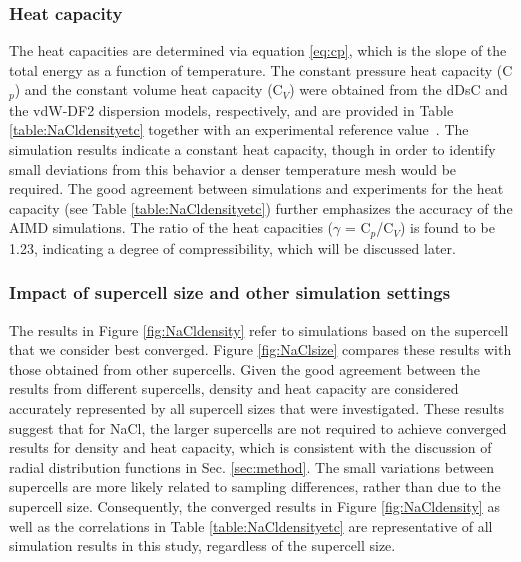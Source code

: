 \documentclass[preprint,3p,10pt,onecolumn,number,sort&compress]{elsarticle}
\begin{document}
\subsubsection{Heat capacity} 
The heat capacities are determined via equation \ref{eq:cp}, which is the slope of the total energy as a function of temperature. The constant pressure heat capacity (C$_p$) and the constant volume heat capacity (C$_V$) were obtained from the dDsC and the vdW-DF2 dispersion models, respectively, and are provided in Table \ref{table:NaCldensityetc} together with an experimental reference value~\cite{NIST}. The simulation results indicate a constant heat capacity, though in order to identify small deviations from this behavior a denser temperature mesh would be required. The good agreement between simulations and experiments for the heat capacity (see Table \ref{table:NaCldensityetc}) further emphasizes the accuracy of the AIMD simulations. The ratio of the heat capacities ($\gamma$ = C$_p$/C$_V$) is found to be 1.23, indicating a degree of compressibility, which will be discussed later. 


\subsubsection{Impact of supercell size and other simulation settings}
The results in Figure \ref{fig:NaCldensity} refer to simulations based on the supercell that we consider best converged. Figure \ref{fig:NaClsize} compares these results with those obtained from other supercells. Given the good agreement between the results from different supercells, density and heat capacity are considered accurately represented by all supercell sizes that were investigated.
 These results suggest that for NaCl, the larger supercells are not required to achieve converged results for density and heat capacity, which is consistent with the discussion of radial distribution functions in Sec. \ref{sec:method}. The small variations between supercells are more likely related to sampling differences, rather than due to the supercell size. Consequently, the converged results in Figure \ref{fig:NaCldensity} as well as the correlations in Table \ref{table:NaCldensityetc} are representative of all simulation results in this study, regardless of the supercell size. %
\end{document}
